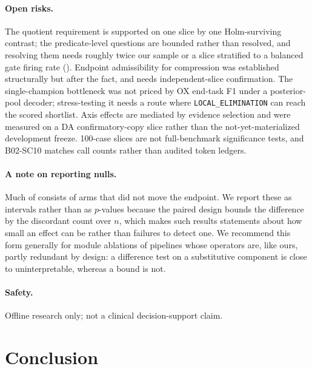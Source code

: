 \paragraph{Open risks.}
The quotient requirement is supported on one slice by one Holm-surviving contrast; the predicate-level questions are bounded rather than resolved, and resolving them needs roughly twice our sample or a slice stratified to a balanced gate firing rate ().
Endpoint admissibility for compression was established structurally but after the fact, and needs independent-slice confirmation.
The single-champion bottleneck was not priced by OX end-task F1 under a posterior-pool decoder; stress-testing it needs a route where \texttt{LOCAL\_ELIMINATION} can reach the scored shortlist.
Axis effects are mediated by evidence selection and were measured on a DA confirmatory-copy slice rather than the not-yet-materialized development freeze.
100-case slices are not full-benchmark significance tests, and B02-SC10 matches call counts rather than audited token ledgers.

\paragraph{A note on reporting nulls.}
Much of  consists of arms that did not move the endpoint.
We report these as intervals rather than as $p$-values because the paired design bounds the difference by the discordant count over $n$, which makes such results statements about how small an effect can be rather than failures to detect one.
We recommend this form generally for module ablations of pipelines whose operators are, like ours, partly redundant by design: a difference test on a substitutive component is close to uninterpretable, whereas a bound is not.

\paragraph{Safety.}
Offline research only; not a clinical decision-support claim.

\section{Conclusion}
\label{sec:conclusion}

